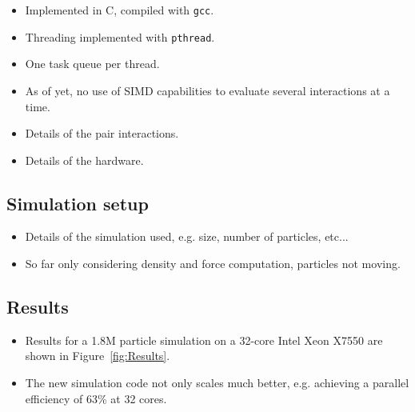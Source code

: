 \documentclass[final]{siamltex}
\newcommand{\fig}[1]
    {Figure~\ref{fig:#1}}
\begin{document}
\begin{itemize}

    \item Implemented in C, compiled with {\tt gcc}.

    \item Threading implemented with {\tt pthread}.

    \item One task queue per thread.
    
    \item As of yet, no use of SIMD capabilities to evaluate several
        interactions at a time.
    
    \item Details of the pair interactions.
    
    \item Details of the hardware.
        
\end{itemize}


\subsection{Simulation setup}

\begin{itemize}

    \item Details of the simulation used, e.g. size, number of particles,
        etc...
        
    \item So far only considering density and force computation,
        particles not moving.
        
\end{itemize}


\subsection{Results}

\begin{itemize}

    \item Results for a 1.8M particle simulation on a 32-core Intel Xeon X7550
        are shown in \fig{Results}.
        
    \item The new simulation code not only scales much better, e.g. achieving
        a parallel efficiency of 63\% at 32 cores.

\end{itemize}
\end{document}
